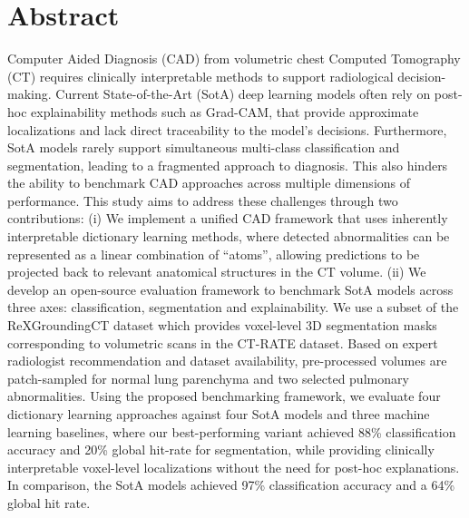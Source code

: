 \chapter*{Abstract}
Computer Aided Diagnosis (CAD) from volumetric chest Computed Tomography (CT) requires clinically interpretable methods to support
radiological decision-making. Current State-of-the-Art (SotA) deep learning models often rely on post-hoc explainability methods
such as Grad-CAM, that provide approximate localizations and lack direct traceability to the model's decisions.
Furthermore, SotA models rarely support simultaneous multi-class classification and segmentation, leading to a fragmented approach
to diagnosis. This also hinders the ability to benchmark CAD approaches across multiple dimensions of performance. This study aims
to address these challenges through two contributions: (i) We implement a unified CAD framework that uses inherently interpretable
dictionary learning methods, where detected abnormalities can be represented as a linear combination of “atoms”, allowing
predictions to be projected back to relevant anatomical structures in the CT volume. (ii) We develop an open-source
evaluation framework to benchmark SotA models across three axes: classification, segmentation and explainability. We use a subset
of the ReXGroundingCT dataset which provides voxel-level 3D segmentation masks corresponding to volumetric scans in the CT-RATE
dataset. Based on expert radiologist recommendation and dataset availability, pre-processed volumes are patch-sampled for
normal lung parenchyma and two selected pulmonary abnormalities. Using the proposed benchmarking framework, we evaluate four
dictionary learning approaches against four SotA models and three machine learning baselines, where our best-performing variant
achieved 88\% classification accuracy and 20\% global hit-rate for segmentation, while providing clinically interpretable
voxel-level localizations without the need for post-hoc explanations. In comparison, the SotA models achieved 97\% classification
accuracy and a 64\% global hit rate.